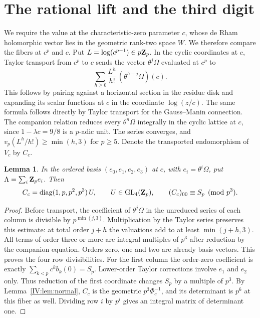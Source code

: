 \documentclass[11pt,letterpaper]{article}
\newtheorem{lemma}[theorem]{Lemma}
\theoremstyle{definition}
\theoremstyle{remark}
\begin{document}
\section{The rational lift and the third digit}\label{IV:sec:fiber}
We require the value at the characteristic-zero parameter $c$, whose
de Rham holomorphic vector lies in the geometric rank-two space $W$.
We therefore compare the fibers at $c^p$ and $c$. Put
$L=\log(c^{p-1})\in p\mathbf Z_p$. In the cyclic coordinates at $c$, Taylor
transport from $c^p$ to $c$ sends the vector $\theta^j\Omega$ evaluated
at $c^p$ to
\[
 \sum_{h\ge0}\frac{L^h}{h!}\,(\theta^{h+j}\Omega)(c).
\]
This follows by pairing against a horizontal section in the residue
disk and expanding its scalar functions at $c$ in the coordinate
$\log(z/c)$. The same formula follows directly by Taylor transport
for the Gauss--Manin connection. The companion relation reduces
every $\theta^n\Omega$ integrally in the cyclic lattice at $c$, since
$1-\lambda c=9/8$ is a $p$-adic unit. The series converges, and
$v_p(L^h/h!)\geq\min(h,3)$ for $p\ge5$. Denote the transported
endomorphism of $V_c$ by $C_c$.

\begin{lemma}\label{IV:lem:div}
In the ordered basis $(e_0,e_1,e_2,e_3)$ at $c$, with $e_i=\theta^i\Omega$,
put $\Lambda=\sum_i\mathbf Z_p e_i$. Then
\[
 C_c=\operatorname{diag}(1,p,p^2,p^3)\,U,\qquad
 U\in\operatorname{GL}_4(\mathbf Z_p),\qquad
 (C_c)_{00}\equiv S_p\pmod{p^3}.
\]
\end{lemma}
\begin{proof}
Before transport, the coefficient of $\theta^j\Omega$ in the
unreduced series of each column is divisible by $p^{\min(j,3)}$.
Multiplication by the Taylor series preserves this estimate: at total
order $j+h$ the valuations add to at least $\min(j+h,3)$.
All terms of order three or more are integral multiples of $p^3$
after reduction by the companion equation. Orders zero, one and two
are already basis vectors. This proves the four row divisibilities.
For the first column the order-zero coefficient is exactly
$\sum_{k<p}c^k b_k(0)=S_p$. Lower-order Taylor corrections involve
$e_1$ and $e_2$ only. Thus reduction of the first coordinate changes
$S_p$ by a multiple of $p^3$. By Lemma~\ref{IV:lem:normal}, $C_c$ is the
geometric $p^3\Phi_c^{-1}$, and its determinant is $p^6$ at this
fiber as well. Dividing row $i$ by $p^i$ gives an integral matrix
of determinant one.
\end{proof}
\end{document}
